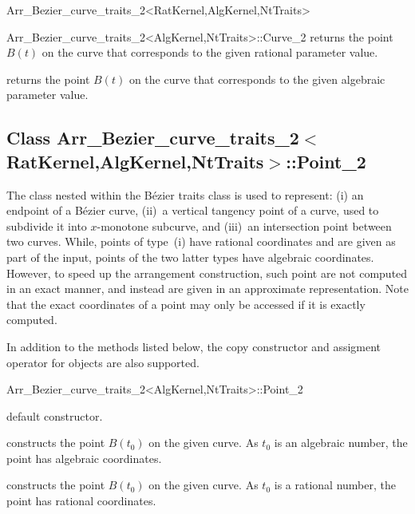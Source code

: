 \begin{ccRefClass}{Arr_Bezier_curve_traits_2<RatKernel,AlgKernel,NtTraits>}
\begin{ccClass}{Arr_Bezier_curve_traits_2<AlgKernel,NtTraits>::Curve_2}
  {returns the point $B(t)$ on the curve that corresponds to the given
   rational parameter value.}

  {returns the point $B(t)$ on the curve that corresponds to the given
   algebraic parameter value.}

\end{ccClass}


\subsection*{Class
         Arr\_Bezier\_curve\_traits\_2$<$RatKernel,AlgKernel,NtTraits$>$::Point\_2}

The  class nested within the B\'ezier traits class is used
to represent: (i) an endpoint of a B\'ezier curve, (ii)~a vertical tangency
point of a curve, used to subdivide it into $x$-monotone subcurve, and
(iii)~an intersection point between two curves. While, points of type~(i) have
rational coordinates and are given as part of the input, points of the two
latter types have algebraic coordinates. However, to speed up the arrangement
construction, such point are not computed in an exact manner, and instead
are given in an approximate representation. Note that the exact coordinates
of a point may only be accessed if it is exactly computed.

In addition to the methods listed below, the copy constructor and assigment
operator for  objects are also supported.

\begin{ccClass}{Arr_Bezier_curve_traits_2<AlgKernel,NtTraits>::Point_2}

\ccCreation
{}

  {default constructor.}

  {constructs the point $B(t_0)$ on the given curve. As $t_0$ is an
   algebraic number, the point has algebraic coordinates.}

  {constructs the point $B(t_0)$ on the given curve. As $t_0$ is a
   rational number, the point has rational coordinates.}


\end{ccClass}
\end{ccRefClass}
